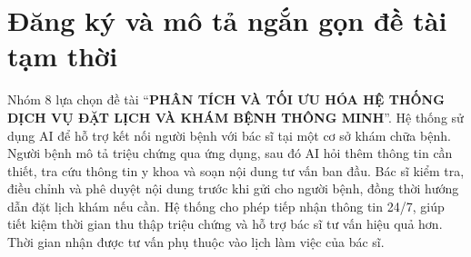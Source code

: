 \section{Đăng ký và mô tả ngắn gọn đề tài tạm thời}
\noindent Nhóm 8 lựa chọn đề tài ``\textbf{PHÂN TÍCH VÀ TỐI ƯU HÓA HỆ THỐNG DỊCH VỤ ĐẶT LỊCH VÀ KHÁM BỆNH THÔNG MINH}''. Hệ thống sử dụng AI để hỗ trợ kết nối người bệnh với bác sĩ tại một cơ sở khám chữa bệnh. Người bệnh mô tả triệu chứng qua ứng dụng, sau đó AI hỏi thêm thông tin cần thiết, tra cứu thông tin y khoa và soạn nội dung tư vấn ban đầu. Bác sĩ kiểm tra, điều chỉnh và phê duyệt nội dung trước khi gửi cho người bệnh, đồng thời hướng dẫn đặt lịch khám nếu cần. Hệ thống cho phép tiếp nhận thông tin 24/7, giúp tiết kiệm thời gian thu thập triệu chứng và hỗ trợ bác sĩ tư vấn hiệu quả hơn. Thời gian nhận được tư vấn phụ thuộc vào lịch làm việc của bác sĩ.
